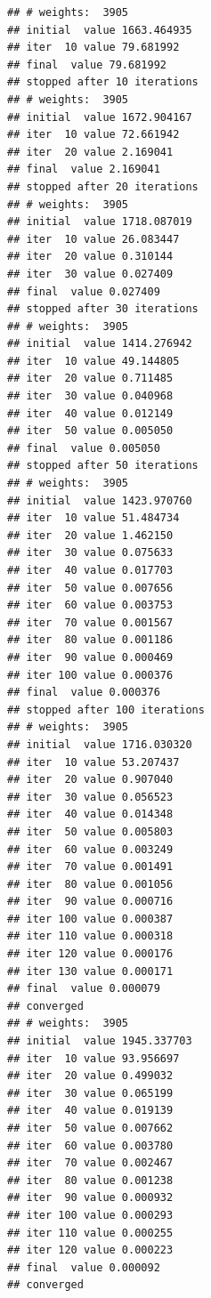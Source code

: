 \documentclass[
]{article}
\begin{document}
\begin{verbatim}
## # weights:  3905
## initial  value 1663.464935 
## iter  10 value 79.681992
## final  value 79.681992 
## stopped after 10 iterations
## # weights:  3905
## initial  value 1672.904167 
## iter  10 value 72.661942
## iter  20 value 2.169041
## final  value 2.169041 
## stopped after 20 iterations
## # weights:  3905
## initial  value 1718.087019 
## iter  10 value 26.083447
## iter  20 value 0.310144
## iter  30 value 0.027409
## final  value 0.027409 
## stopped after 30 iterations
## # weights:  3905
## initial  value 1414.276942 
## iter  10 value 49.144805
## iter  20 value 0.711485
## iter  30 value 0.040968
## iter  40 value 0.012149
## iter  50 value 0.005050
## final  value 0.005050 
## stopped after 50 iterations
## # weights:  3905
## initial  value 1423.970760 
## iter  10 value 51.484734
## iter  20 value 1.462150
## iter  30 value 0.075633
## iter  40 value 0.017703
## iter  50 value 0.007656
## iter  60 value 0.003753
## iter  70 value 0.001567
## iter  80 value 0.001186
## iter  90 value 0.000469
## iter 100 value 0.000376
## final  value 0.000376 
## stopped after 100 iterations
## # weights:  3905
## initial  value 1716.030320 
## iter  10 value 53.207437
## iter  20 value 0.907040
## iter  30 value 0.056523
## iter  40 value 0.014348
## iter  50 value 0.005803
## iter  60 value 0.003249
## iter  70 value 0.001491
## iter  80 value 0.001056
## iter  90 value 0.000716
## iter 100 value 0.000387
## iter 110 value 0.000318
## iter 120 value 0.000176
## iter 130 value 0.000171
## final  value 0.000079 
## converged
## # weights:  3905
## initial  value 1945.337703 
## iter  10 value 93.956697
## iter  20 value 0.499032
## iter  30 value 0.065199
## iter  40 value 0.019139
## iter  50 value 0.007662
## iter  60 value 0.003780
## iter  70 value 0.002467
## iter  80 value 0.001238
## iter  90 value 0.000932
## iter 100 value 0.000293
## iter 110 value 0.000255
## iter 120 value 0.000223
## final  value 0.000092 
## converged
\end{verbatim}
\end{document}
